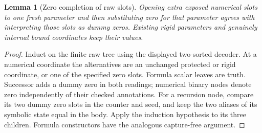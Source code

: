 \documentclass[11pt,letterpaper]{article}
\newtheorem{lemma}[theorem]{Lemma}
\theoremstyle{definition}\newtheorem{definition}[theorem]{Definition}
\theoremstyle{remark}\newtheorem{remark}[theorem]{Remark}
\begin{document}
\begin{lemma}[Zero completion of raw slots]\label{lem:checker-zero}
Opening extra exposed numerical slots to one fresh parameter and then
substituting zero for that parameter agrees with interpreting those
slots as dummy zeros. Existing rigid parameters and genuinely internal
bound coordinates keep their values.
\end{lemma}
\begin{proof}
Induct on the finite raw tree using the displayed two-sorted decoder.
At a numerical coordinate the alternatives are an unchanged protected
or rigid coordinate, or one of the specified zero slots. Formula scalar
leaves are truth. Successor adds a dummy zero in both readings; numerical
binary nodes denote zero independently of their checked annotations.
For a recursion node, compare its two dummy zero slots in the counter
and seed, and keep the two aliases of its symbolic state equal in the
body. Apply the induction hypothesis to its three children. Formula
constructors have the analogous capture-free argument.
\end{proof}
\end{document}
